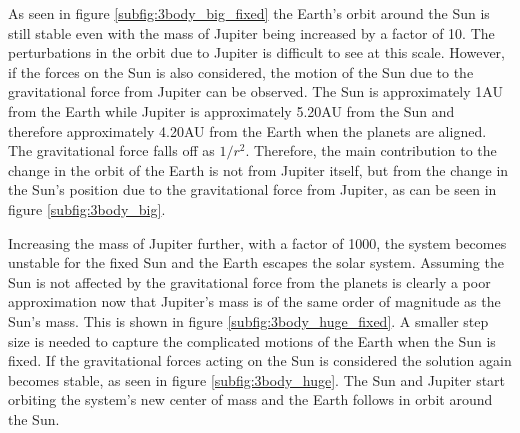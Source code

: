 \documentclass{article}
\begin{document}
As seen in figure \ref{subfig:3body_big_fixed} the Earth's orbit around the Sun is still stable even with the mass of Jupiter being increased by a factor of 10. The perturbations in the orbit due to Jupiter is difficult to see at this scale. However, if the forces on the Sun is also considered, the motion of the Sun due to the gravitational force from Jupiter can be observed. The Sun is approximately 1AU from the Earth while Jupiter is approximately 5.20AU from the Sun and therefore approximately 4.20AU from the Earth when the planets are aligned. The gravitational force falls off as $1/r^2$. Therefore, the main contribution to the change in the orbit of the Earth is not from Jupiter itself, but from the change in the Sun's position due to the gravitational force from Jupiter, as can be seen in figure \ref{subfig:3body_big}. 

Increasing the mass of Jupiter further, with a factor of 1000, the system becomes unstable for the fixed Sun and the Earth escapes the solar system. Assuming the Sun is not affected by the gravitational force from the planets is clearly a poor approximation now that Jupiter's mass is of the same order of magnitude as the Sun's mass. This is shown in figure \ref{subfig:3body_huge_fixed}. A smaller step size is needed to capture the complicated motions of the Earth when the Sun is fixed. If the gravitational forces acting on the Sun is considered the solution again becomes stable, as seen in figure \ref{subfig:3body_huge}. The Sun and Jupiter start orbiting the system's new center of mass and the Earth follows in orbit around the Sun.
\end{document}
